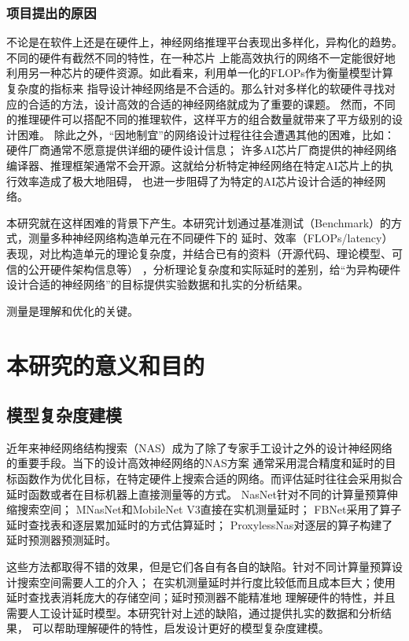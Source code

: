 \subsubsection{项目提出的原因}

不论是在软件上还是在硬件上，神经网络推理平台表现出多样化，异构化的趋势。不同的硬件有截然不同的特性，在一种芯片
上能高效执行的网络不一定能很好地利用另一种芯片的硬件资源。如此看来，利用单一化的FLOPs作为衡量模型计算复杂度的指标来
指导设计神经网络是不合适的。那么针对多样化的软硬件寻找对应的合适的方法，设计高效的合适的神经网络就成为了重要的课题。
然而，不同的推理硬件可以搭配不同的推理软件，这样平方的组合数量就带来了平方级别的设计困难。
除此之外，``因地制宜''的网络设计过程往往会遭遇其他的困难，比如：硬件厂商通常不愿意提供详细的硬件设计信息；
许多AI芯片厂商提供的神经网络编译器、推理框架通常不会开源。这就给分析特定神经网络在特定AI芯片上的执行效率造成了极大地阻碍，
也进一步阻碍了为特定的AI芯片设计合适的神经网络。

本研究就在这样困难的背景下产生。本研究计划通过基准测试（Benchmark）的方式，测量多种神经网络构造单元在不同硬件下的
延时、效率（FLOPs/latency）表现，对比构造单元的理论复杂度，并结合已有的资料（开源代码、理论模型、可信的公开硬件架构信息等）
，分析理论复杂度和实际延时的差别，给``为异构硬件设计合适的神经网络''的目标提供实验数据和扎实的分析结果。

测量是理解和优化的关键。

\section{本研究的意义和目的}

\subsection{模型复杂度建模}
近年来神经网络结构搜索（NAS）成为了除了专家手工设计之外的设计神经网络的重要手段。当下的设计高效神经网络的NAS方案
通常采用混合精度和延时的目标函数作为优化目标，在特定硬件上搜索合适的网络。而评估延时往往会采用拟合
延时函数或者在目标机器上直接测量等的方式。
NasNet\cite{zoph2018learning}针对不同的计算量预算伸缩搜索空间；
MNasNet\cite{tan2019mnasnet}和MobileNet V3\cite{howard2019searching}直接在实机测量延时；
FBNet\cite{wu2019fbnet}采用了算子延时查找表和逐层累加延时的方式估算延时；
ProxylessNas\cite{cai2018proxylessnas}对逐层的算子构建了延时预测器预测延时。

这些方法都取得不错的效果，但是它们各自有各自的缺陷。针对不同计算量预算设计搜索空间需要人工的介入；
在实机测量延时并行度比较低而且成本巨大；使用延时查找表消耗庞大的存储空间；延时预测器不能精准地
理解硬件的特性，并且需要人工设计延时模型。本研究针对上述的缺陷，通过提供扎实的数据和分析结果，
可以帮助理解硬件的特性，启发设计更好的模型复杂度建模。

